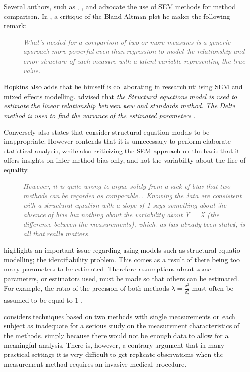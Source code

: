 \documentclass[12pt, a4paper]{report}
\theoremstyle{plain}
\theoremstyle{definition}
\theoremstyle{remark}
\begin{document}
Several authors, such as \citet{lewis1991}, \citet{gkelly1985}, \citet{voelkel2005} and \citet{hopkins2004bias} advocate the use of SEM methods for method comparison. In \citet{hopkins2004bias}, a critique of the Bland-Altman plot he makes the following remark:

\begin{quote}
\textit{What's needed for a comparison of two or more measures is a
		generic approach more powerful even than regression to model the
		relationship and error structure of each measure with a latent
		variable representing the true value.}
\end{quote}	

Hopkins also adds that he himself is collaborating in research utilising SEM and mixed effects modelling. \citet{gkelly1985} advised that \textit{the Structural equations model is used to estimate the linear relationship between new and standards method. The Delta method is used to find the variance of the estimated parameters} \citep{gkelly1985}.
	
	
Conversely \citet{BA99} also states that consider structural equation models to be inappropriate. However \citet{BA87} contends that it is unnecessary to perform elaborate statistical analysis, while also criticizing the SEM approach on the basis that it offers insights  on inter-method bias only, and not the variability about the line of equality. 
	\begin{quote}
		\textit{However, it is quite wrong to argue solely from a lack of bias that two methods can be regarded as comparable...
			Knowing the data are consistent with a structural equation with a slope of 1 says something 
			about the absence of bias but nothing about the variability about Y = X (the difference between the measurements), which, as has already been stated, is all that really matters.}
	\end{quote}

\citet{DunnSEME} highlights an important issue regarding using
models such as structural equatio modelling; the identifiability problem. This comes as a result of there being too many parameters to be estimated.
Therefore assumptions about some parameters, or estimators used,
must be made so that others can be estimated. For example, the ratio of the precision of both methods $\lambda=\frac{\sigma^{2}_{1}}{\sigma^{2}_{2}}$
must often be assumed to be equal to $1$ \citep{linnet98}. 

\citet{DunnSEME} considers techniques based on two methods with single measurements on each subject as inadequate for a serious study on the measurement characteristics of the methods, simply because there would not be enough data to allow for a meaningful analysis. There is, however, a contrary argument that in many practical settings it is very difficult to get replicate
observations when the measurement method requires an invasive medical
procedure.
\end{document}
